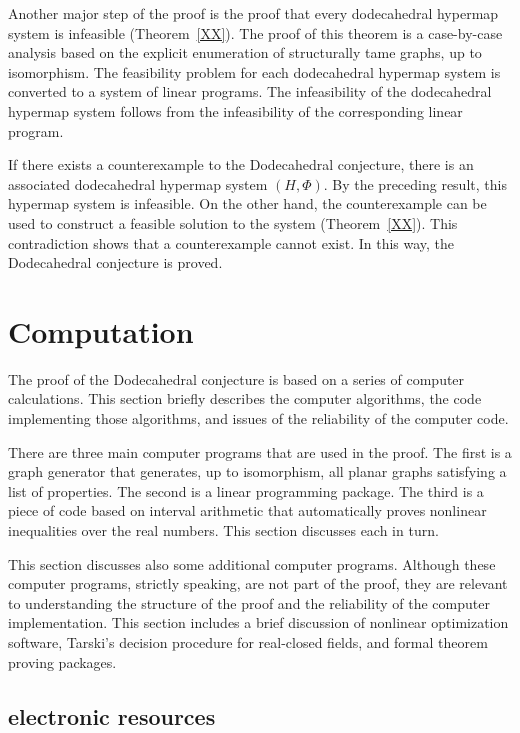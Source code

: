 Another major step of the proof is the proof that every dodecahedral hypermap
system is infeasible (Theorem~\ref{XX}).   The proof of this theorem
is a case-by-case analysis based on the explicit enumeration of
structurally tame graphs, up to isomorphism.   The feasibility problem for 
each dodecahedral hypermap system is converted to a system of linear programs.
The infeasibility of the dodecahedral hypermap system follows from the
infeasibility of the corresponding linear program.

If there exists a counterexample to the Dodecahedral conjecture,
there is an associated dodecahedral hypermap system $(H,\Phi)$.  By the preceding
result, this hypermap system is infeasible.  On the other hand, 
the counterexample can be used to construct a feasible solution to the system 
(Theorem~\ref{XX}).
This contradiction shows that a counterexample cannot exist.
In this way, the Dodecahedral conjecture is proved.







\section{Computation}

The proof of the Dodecahedral conjecture is based on a series
of computer calculations.  This section briefly describes the
computer algorithms, the code implementing those algorithms,
and issues of the reliability of the computer code.

There are three main computer programs that are used in the proof.
The first is a graph generator that generates, up to isomorphism,
 all planar graphs satisfying a list of properties.  The second is
a linear programming package.  The third is a piece of code based
on interval arithmetic that
automatically proves nonlinear inequalities over the real numbers.
This section discusses each in turn.  

This section discusses  also some
additional computer programs.  Although these computer programs,
strictly speaking, are not part of the proof, they are relevant
to understanding the structure of the proof and the reliability of
the computer implementation.   This section includes a brief discussion of
nonlinear optimization software, Tarski's decision procedure for
real-closed fields, and formal theorem proving packages.

\subsection{electronic resources}

